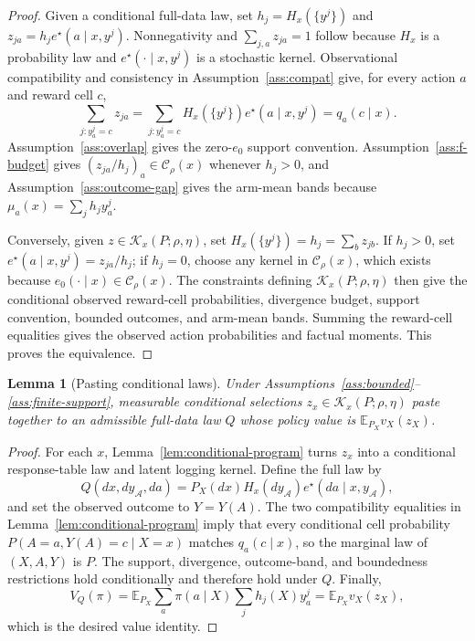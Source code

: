 \documentclass[11pt]{article}
\newcommand{\E}{\mathbb{E}}
\theoremstyle{definition}
\theoremstyle{plain}
\newtheorem{lemma}{Lemma}
\theoremstyle{remark}
\begin{document}
\begin{proof}
Given a conditional full-data law, set $h_j=H_x(\{y^j\})$ and
$z_{ja}=h_j e^\star(a\mid x,y^j)$.  Nonnegativity and
$\sum_{j,a}z_{ja}=1$ follow because $H_x$ is a probability law and
$e^\star(\cdot\mid x,y^j)$ is a stochastic kernel.  Observational compatibility
and consistency in Assumption~\ref{ass:compat} give, for every action $a$ and
reward cell $c$,
\[
  \sum_{j:y^j_a=c}z_{ja}
  =\sum_{j:y^j_a=c}H_x(\{y^j\})e^\star(a\mid x,y^j)
  =q_a(c\mid x).
\]
Assumption~\ref{ass:overlap} gives the zero-$e_0$ support convention.
Assumption~\ref{ass:f-budget} gives
$(z_{ja}/h_j)_a\in\mathcal C_\rho(x)$ whenever $h_j>0$, and
Assumption~\ref{ass:outcome-gap} gives the arm-mean bands because
$\mu_a(x)=\sum_j h_jy^j_a$.

Conversely, given $z\in\mathcal K_x(P;\rho,\eta)$, set
$H_x(\{y^j\})=h_j=\sum_b z_{jb}$.  If $h_j>0$, set
$e^\star(a\mid x,y^j)=z_{ja}/h_j$; if $h_j=0$, choose any kernel in
$\mathcal C_\rho(x)$, which exists because $e_0(\cdot\mid x)\in\mathcal C_\rho(x)$.
The constraints defining $\mathcal K_x(P;\rho,\eta)$ then give the conditional
observed reward-cell probabilities, divergence budget, support convention,
bounded outcomes, and arm-mean bands.  Summing the reward-cell equalities gives
the observed action probabilities and factual moments.  This proves the
equivalence.
\end{proof}

\begin{lemma}[Pasting conditional laws]\label{lem:pasting}
Under Assumptions~\ref{ass:bounded}--\ref{ass:finite-support}, measurable
conditional selections
$z_x\in\mathcal K_x(P;\rho,\eta)$ paste together to an admissible
full-data law $Q$ whose policy value is
$\E_{P_X}v_X(z_X)$.
\end{lemma}

\begin{proof}
For each $x$, Lemma~\ref{lem:conditional-program} turns $z_x$ into a
conditional response-table law and latent logging kernel.  Define the full law
by
\[
  Q(dx,dy_{\mathcal A},da)
  =P_X(dx)H_x(dy_{\mathcal A})e^\star(da\mid x,y_{\mathcal A}),
\]
and set the observed outcome to $Y=Y(A)$.  The two compatibility equalities in
Lemma~\ref{lem:conditional-program} imply that every conditional cell
probability $P(A=a,Y(A)=c\mid X=x)$ matches $q_a(c\mid x)$, so the marginal law
of $(X,A,Y)$ is $P$.  The support, divergence, outcome-band, and boundedness
restrictions hold conditionally and therefore hold under $Q$.  Finally,
\[
  V_Q(\pi)=\E_{P_X}\sum_a\pi(a\mid X)\sum_j h_j(X)y^j_a
          =\E_{P_X}v_X(z_X),
\]
which is the desired value identity.
\end{proof}
\end{document}
